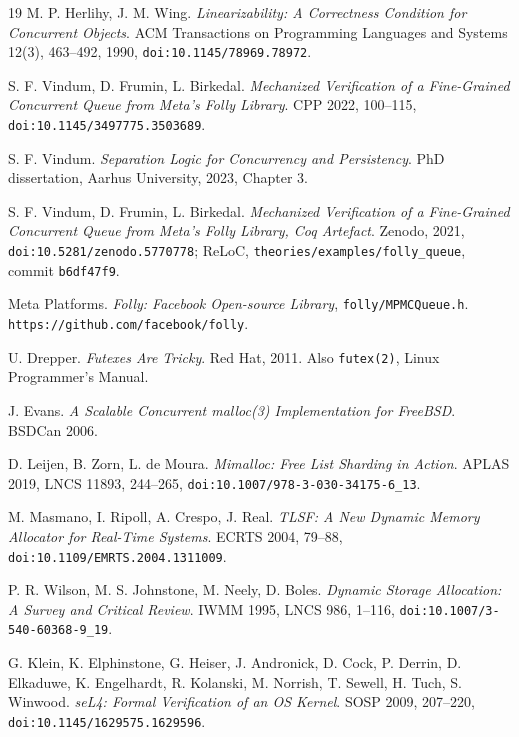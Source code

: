 \begin{thebibliography}{19}
M. P. Herlihy, J. M. Wing. \emph{Linearizability: A Correctness Condition for Concurrent Objects}. ACM Transactions on Programming Languages and Systems 12(3), 463--492, 1990, \texttt{doi:10.1145/\allowbreak{}78969.78972}.

S. F. Vindum, D. Frumin, L. Birkedal. \emph{Mechanized Verification of a Fine-Grained Concurrent Queue from Meta's Folly Library}. CPP 2022, 100--115, \texttt{doi:10.1145/\allowbreak{}3497775.3503689}.

S. F. Vindum. \emph{Separation Logic for Concurrency and Persistency}. PhD dissertation, Aarhus University, 2023, Chapter 3.

S. F. Vindum, D. Frumin, L. Birkedal. \emph{Mechanized Verification of a Fine-Grained Concurrent Queue from Meta's Folly Library, Coq Artefact}. Zenodo, 2021, \texttt{doi:10.5281/\allowbreak{}zenodo.5770778}; ReLoC, \texttt{theories/\allowbreak{}examples/\allowbreak{}folly\_queue}, commit \texttt{b6df47f9}.

Meta Platforms. \emph{Folly: Facebook Open-source Library}, \texttt{folly/\allowbreak{}MPMCQueue.h}. \texttt{https://\allowbreak{}github.com/\allowbreak{}facebook/\allowbreak{}folly}.

U. Drepper. \emph{Futexes Are Tricky}. Red Hat, 2011. Also \texttt{futex(2)}, Linux Programmer's Manual.

J. Evans. \emph{A Scalable Concurrent malloc(3) Implementation for FreeBSD}. BSDCan 2006.

D. Leijen, B. Zorn, L. de Moura. \emph{Mimalloc: Free List Sharding in Action}. APLAS 2019, LNCS 11893, 244--265, \texttt{doi:10.1007/\allowbreak{}978-3-030-34175-6\_13}.

M. Masmano, I. Ripoll, A. Crespo, J. Real. \emph{TLSF: A New Dynamic Memory Allocator for Real-Time Systems}. ECRTS 2004, 79--88, \texttt{doi:10.1109/\allowbreak{}EMRTS.2004.1311009}.

P. R. Wilson, M. S. Johnstone, M. Neely, D. Boles. \emph{Dynamic Storage Allocation: A Survey and Critical Review}. IWMM 1995, LNCS 986, 1--116, \texttt{doi:10.1007/\allowbreak{}3-540-60368-9\_19}.

G. Klein, K. Elphinstone, G. Heiser, J. Andronick, D. Cock, P. Derrin, D. Elkaduwe, K. Engelhardt, R. Kolanski, M. Norrish, T. Sewell, H. Tuch, S. Winwood. \emph{seL4: Formal Verification of an OS Kernel}. SOSP 2009, 207--220, \texttt{doi:10.1145/\allowbreak{}1629575.1629596}.


\end{thebibliography}
